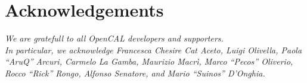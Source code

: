 \chapter*{Acknowledgements}


\emph{We are gratefull to all OpenCAL developers and supporters.\\
  In particular, we acknowledge Francesca Chesire Cat
  Aceto, Luigi Olivella, Paola ``AruQ'' Arcuri, Carmelo La Gamba, Maurizio
  Macrì, Marco ``Pecos'' Oliverio, Rocco ``Rick'' Rongo, Alfonso Senatore, and
  Mario ``Suinos'' D'Onghia.}

\newpage

